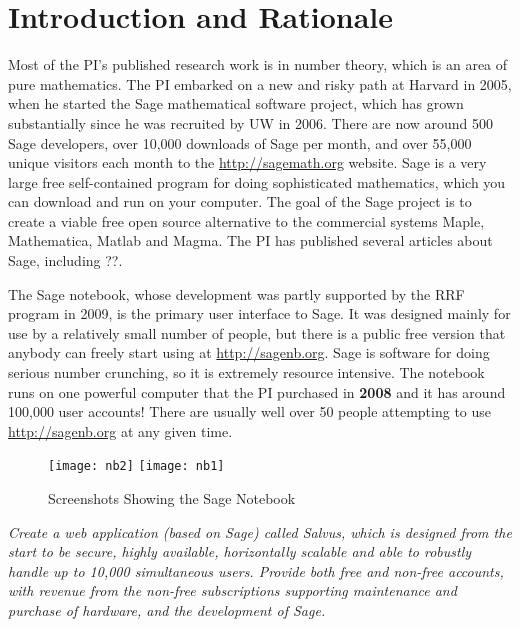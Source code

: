 \documentclass[11pt]{article}
\begin{document}
\section{Introduction and Rationale}


Most of the PI's published research work is in number theory, which is
an area of pure mathematics.  The PI embarked on a new and risky path
at Harvard in 2005, when he started the Sage mathematical software
project, which has grown substantially since he was recruited by UW in
2006.  There are now around 500 Sage developers, over 10,000 downloads
of Sage per month, and over 55,000 unique visitors each month to the
\url{http://sagemath.org} website.  Sage is a very large free
self-contained program for doing sophisticated mathematics, which you
can download and run on your computer.  The goal of the Sage project is to
create a viable free open source alternative to the commercial systems
Maple, Mathematica, Matlab and Magma.
The PI has published several articles about Sage, including
\cite{} ??.

The Sage notebook, whose development was partly supported by the RRF
program in 2009, is the primary user interface to Sage.  It was
designed mainly for use by a relatively small number of people, but
there is a public free version that anybody can freely start using at
\url{http://sagenb.org}.  Sage is software for doing serious number
crunching, so it is extremely resource intensive.  The notebook runs
on one powerful computer that the PI purchased in {\bf 2008} and it
has around 100,000 user accounts!  There are usually well over 50
people attempting to use \url{http://sagenb.org} at any given time.

\begin{center}
\begin{figure}[ht]
\hfill
\texttt{[image: nb2]}
\hfill
\texttt{[image: nb1]}
\hfill
\mbox{}
\caption{Screenshots Showing the Sage Notebook\label{fig:sagenb}}
\end{figure}
\end{center}

 {\em Create a web application (based on Sage)
  called Salvus, which is designed from the start to be secure, highly
  available, horizontally scalable and able to robustly handle up to
  10,000 simultaneous users.  Provide both free and non-free accounts,
  with revenue from the non-free subscriptions supporting maintenance
  and purchase of hardware, and the development of Sage.}
\end{document}
